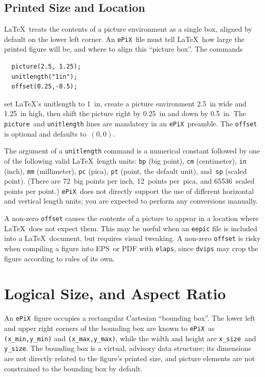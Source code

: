 \documentclass[12pt]{report}
\newcommand{\code}[1]{\texttt{#1}}
\newcommand{\ePiX}{\code{ePiX}}
\begin{document}
\subsection*{Printed Size and Location}

\LaTeX\ treats the contents of a picture environment as a single box,
aligned by default on the lower left corner. An \ePiX\ file must tell
\LaTeX\ how large the printed figure will be, and where to align this
``picture box''. The commands
\begin{verbatim}
  picture(2.5, 1.25);
  unitlength("1in");
  offset(0.25,-0.5);
\end{verbatim}
set \LaTeX's unitlength to 1~in, create a picture environment 2.5~in
wide and 1.25~in high, then shift the picture right by 0.25~in and
down by 0.5~in. The \code{picture}~and \code{unitlength} lines are
mandatory in an \ePiX\ preamble. The \code{offset} is optional and
defaults to~$(0,0)$.

The argument of a \code{unitlength} command is a numerical constant
followed by one of the following valid \LaTeX\ length units: \code{bp}
(big point), \code{cm} (centimeter), \code{in} (inch), \code{mm}
(millimeter), \code{pc} (pica), \code{pt} (point, the default unit),
and~\code{sp} (scaled point).  (There are 72~big points per inch,
12~points per~pica, and 65536~scaled points per point.)  \ePiX\ does
not directly support the use of different horizontal and vertical
length units; you are expected to perform any conversions manually.

A non-zero \code{offset} causes the contents of a picture to appear in
a location where \LaTeX\ does not expect them. This may be useful when
an \code{eepic} file is included into a \LaTeX\ document, but requires
visual tweaking. A non-zero \code{offset} is risky when compiling a
figure into EPS~or PDF with \code{elaps}, since \code{dvips} may crop
the figure according to rules of its own.


\section{Logical Size, and Aspect Ratio}

An \ePiX\ figure occupies a rectangular Cartesian ``bounding box''.
The lower left and upper right corners of the bounding box are known
to \ePiX\ as \code{(x\_min,y\_min)} and \code{(x\_max,y\_max)}, while
the width and height are \code{x\_size}~and \code{y\_size}. The
bounding box is a virtual, advisory data structure; its dimensions are
not directly related to the figure's printed size, and picture
elements are not constrained to the bounding box by default.
\end{document}
